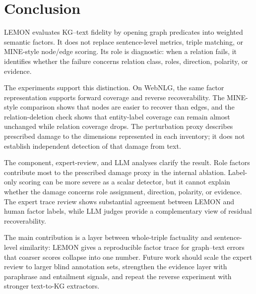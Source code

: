 \section{Conclusion}
LEMON evaluates KG--text fidelity by opening graph predicates into weighted semantic factors. It does not replace sentence-level metrics, triple matching, or MINE-style node/edge scoring. Its role is diagnostic: when a relation fails, it identifies whether the failure concerns relation class, roles, direction, polarity, or evidence.

The experiments support this distinction. On WebNLG, the same factor representation supports forward coverage and reverse recoverability. The MINE-style comparison shows that nodes are easier to recover than edges, and the relation-deletion check shows that entity-label coverage can remain almost unchanged while relation coverage drops. The perturbation proxy describes prescribed damage to the dimensions represented in each inventory; it does not establish independent detection of that damage from text.

The component, expert-review, and LLM analyses clarify the result. Role factors contribute most to the prescribed damage proxy in the internal ablation. Label-only scoring can be more severe as a scalar detector, but it cannot explain whether the damage concerns role assignment, direction, polarity, or evidence. The expert trace review shows substantial agreement between LEMON and human factor labels, while LLM judges provide a complementary view of residual recoverability.

The main contribution is a layer between whole-triple factuality and sentence-level similarity: LEMON gives a reproducible factor trace for graph--text errors that coarser scores collapse into one number. Future work should scale the expert review to larger blind annotation sets, strengthen the evidence layer with paraphrase and entailment signals, and repeat the reverse experiment with stronger text-to-KG extractors.
